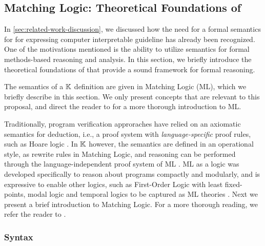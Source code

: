 \subsection{Matching Logic: Theoretical Foundations of \K{}}

In \autoref{sec:related-work-discussion}, we discussed how
the need for a formal semantics for \DSLs{} for expressing
computer interpretable guideline has already been recognized.
One of the motivations mentioned is the ability to utilize
semantics for formal methods-based reasoning and analysis.
In this section, we briefly introduce the theoretical foundations
of \K{} that provide a sound framework for formal reasoning.

The semantics of a $\mathbb{K}$ definition are given in
Matching Logic (ML), which we briefly
describe in this section. We only present concepts that are
relevant to this proposal, and direct the reader to \cite{RosuLMCS17,ChenLICS19}
for a more thorough introduction to ML.

Traditionally, program verification approraches have
relied on an axiomatic semantics for deduction, i.e., a proof system with
\emph{language-specific} proof rules, such as Hoare logic \cite{HoareACM69}.
In $\mathbb{K}$ however, the semantics are defined in an operational style, as
rewrite rules in Matching Logic, and reasoning can be performed through
the language-independent proof system of ML \cite{MatchingLogicUrl}.
ML as a logic was developed specifically to reason about programs
compactly and modularly, and is expressive to enable other logics,
such as First-Order Logic with least fixed-points, modal logic and temporal
logics to be captured as ML theories \cite{RosuLMCS17,ChenLICS19,ChenTR20,ChenICFP20}.
Next we present a brief introduction to Matching Logic. For a more
thorough reading, we refer the reader to \cite{ChenTR20}.

\subsubsection{Syntax}


